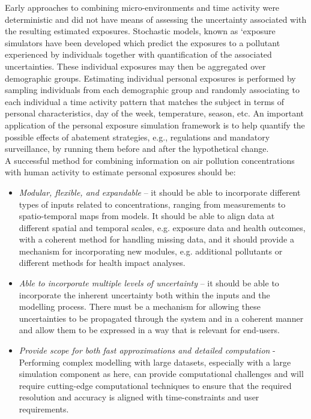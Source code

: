\documentclass{article}
\begin{document}
\noindent Early approaches to combining micro-environments and time activity were deterministic and did not have means of assessing the uncertainty associated with the resulting estimated exposures.  Stochastic models, known as ‘exposure simulators have been developed which predict the exposures to a pollutant experienced by individuals together with quantification of the associated uncertainties.  These individual exposures may then be aggregated over demographic groups. Estimating individual personal exposures is performed by sampling individuals from each demographic group and randomly associating to each individual a time activity pattern that matches the subject in terms of personal characteristics, day of the week, temperature, season, etc. An important application of the personal exposure simulation framework is to help quantify the possible effects of abatement strategies, e.g., regulations and mandatory surveillance, by running them before and after the hypothetical change. \\

\noindent A successful method for combining information on air pollution concentrations with human activity to estimate
personal exposures should be:
\begin{itemize} 
    \item \textit{Modular, flexible, and expandable} – it should be able to incorporate different types of inputs related to concentrations, ranging from measurements to spatio-temporal maps from models. It should be able to align data at different spatial and temporal scales, e.g. exposure data and health outcomes, with a coherent method for handling missing data, and it should provide a mechanism for incorporating new modules, e.g. additional pollutants or different methods for health impact analyses.
    \item \textit{Able to incorporate multiple levels of uncertainty} – it should be able to incorporate the inherent uncertainty both within the inputs and the modelling process. There must be a mechanism for allowing these uncertainties to be propagated through the system and in a coherent manner and allow them to be expressed in a way that is relevant for end-users.
    \item \textit{Provide scope for both fast approximations and detailed computation} - Performing complex modelling with large datasets, especially with a large simulation component as here, can provide computational challenges and will require cutting-edge computational techniques to ensure that the required resolution and accuracy is aligned with time-constraints and user requirements.
\end{itemize}
\end{document}
